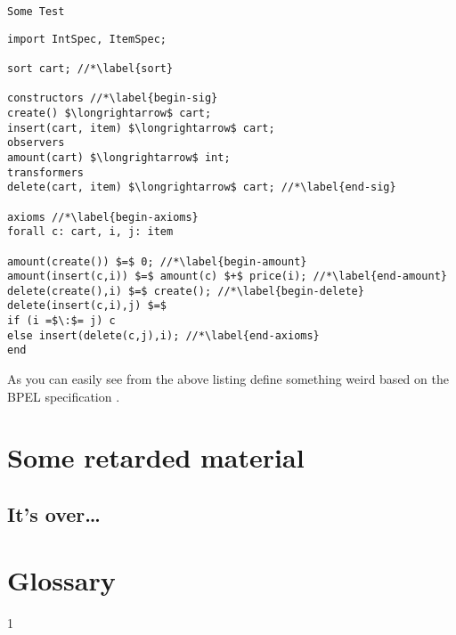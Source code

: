 \documentclass[mscthesis]{usiinfthesis}
\begin{document}
  \texttt{Some Test}
\begin{lstlisting}
import IntSpec, ItemSpec;

sort cart; //*\label{sort}

constructors //*\label{begin-sig}
create() $\longrightarrow$ cart;
insert(cart, item) $\longrightarrow$ cart;
observers
amount(cart) $\longrightarrow$ int;
transformers
delete(cart, item) $\longrightarrow$ cart; //*\label{end-sig}

axioms //*\label{begin-axioms}
forall c: cart, i, j: item 

amount(create()) $=$ 0; //*\label{begin-amount}
amount(insert(c,i)) $=$ amount(c) $+$ price(i); //*\label{end-amount}
delete(create(),i) $=$ create(); //*\label{begin-delete}
delete(insert(c,i),j) $=$
if (i =$\:$= j) c
else insert(delete(c,j),i); //*\label{end-axioms}
end
\end{lstlisting}

As you can easily see from the above listing \citet{bbggs:iet07}
define something weird based on the BPEL specification
\citep{bpelspec}.
\nocite{*}

\appendix %

\chapter{Some retarded material}
\section{It's over\dots}

\backmatter

\chapter{Glossary} %

%
%



1
\end{document}
